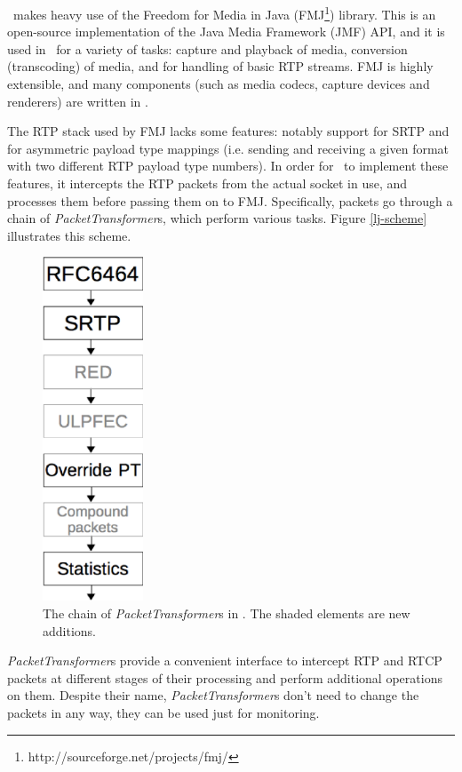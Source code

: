 \documentclass[twoside,openright,a4paper,12pt,english]{article}
\begin{document}
\lj\ makes heavy use of the Freedom for Media in Java
(FMJ\footnote{http://sourceforge.net/projects/fmj/}) library. This is an
open-source implementation of the Java Media Framework (JMF) API, and it is
used in \lj\ for a variety of tasks: capture and playback of media, conversion
(transcoding) of media, and for handling of basic RTP streams. FMJ is highly extensible, and
many components (such as media codecs, capture devices and renderers) are written in \lj.


The RTP stack used by FMJ lacks some features: notably support for SRTP and 
for asymmetric payload type mappings (i.e. sending and receiving a given format
with two different RTP payload type numbers). In order for \lj\ to implement these features, it
intercepts the RTP packets from the actual socket in use, and processes them
before passing them on to FMJ. Specifically, packets go through a chain of
\emph{PacketTransformer}s, which perform various tasks. Figure \ref{lj-scheme}
illustrates this scheme.

\begin{figure}
   \centering
        \includegraphics[width=3cm]{./pics/lj-pt.eps}
        \caption{The chain of \emph{PacketTransformer}s in \lj. The shaded elements are new additions.}
   \label{lj-pt}
\end{figure}
\emph{PacketTransformer}s provide a convenient interface to intercept RTP and
RTCP packets at different stages of their processing and perform additional
operations on them. Despite their name, \emph{PacketTransformer}s don't need to change
the packets in any way, they can be used just for monitoring. 
\end{document}

